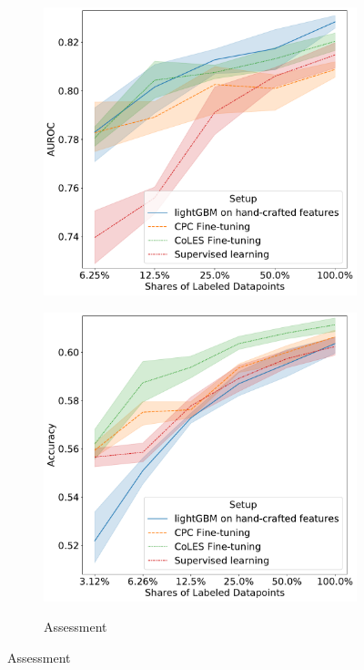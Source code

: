 \documentclass{article}
\begin{document}
\begin{figure}
\begin{subfigure}{0.5\linewidth}
    \includegraphics[width=\linewidth]{figures/ss_rosbank_per.pdf}
    \label{fig-semi-churn}
  \end{subfigure}
  \begin{subfigure}{0.5\linewidth}
    \caption{Assessment}
    \includegraphics[width=\linewidth]{figures/ss_bowl2019_per.pdf}
    \label{fig-semi-assessment2}

\end{subfigure}
\end{figure}
\end{document}
